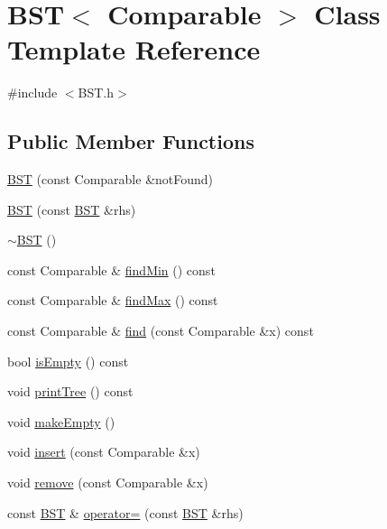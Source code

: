 \hypertarget{classBST}{}\section{B\+ST$<$ Comparable $>$ Class Template Reference}
\label{classBST}


{\ttfamily \#include $<$B\+S\+T.\+h$>$}

\subsection*{Public Member Functions}
\begin{DoxyCompactItemize}
\item 
\hyperlink{classBST_a3185a79cf472271f122a97d0f59022d1}{B\+ST} (const Comparable \&not\+Found)
\item 
\hyperlink{classBST_a163232cc6ffcbd1a51707efcc3fa36ca}{B\+ST} (const \hyperlink{classBST}{B\+ST} \&rhs)
\item 
\hyperlink{classBST_abf3125f968641c8726101c5dd18f36be}{$\sim$\+B\+ST} ()
\item 
const Comparable \& \hyperlink{classBST_a34fd17be76f49a77573185f29dede6be}{find\+Min} () const 
\item 
const Comparable \& \hyperlink{classBST_aee725fe273c0b3641070883b50eee271}{find\+Max} () const 
\item 
const Comparable \& \hyperlink{classBST_a337dce7f94a881e253635cbf3ac7eacf}{find} (const Comparable \&x) const 
\item 
bool \hyperlink{classBST_a8018fc7d6c15b2564c10ddcc4316c64d}{is\+Empty} () const 
\item 
void \hyperlink{classBST_a5270473db9e17e1737b92dd0d6cd0ee5}{print\+Tree} () const 
\item 
void \hyperlink{classBST_a050d829503a88714c4ad0773cf6d3af6}{make\+Empty} ()
\item 
void \hyperlink{classBST_a2b117df6521c7d61dac75ff2c938bae7}{insert} (const Comparable \&x)
\item 
void \hyperlink{classBST_a6f01a0b44daf82a42022b6eb4c0df7a2}{remove} (const Comparable \&x)
\item 
const \hyperlink{classBST}{B\+ST} \& \hyperlink{classBST_aa80c39f454c89d4a202be3d1445823f3}{operator=} (const \hyperlink{classBST}{B\+ST} \&rhs)
\end{DoxyCompactItemize}
